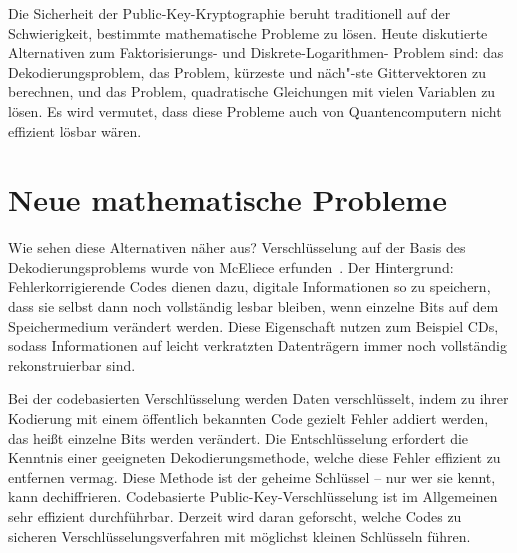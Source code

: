 \begin{refsegment}
Die Sicherheit der Public-Key-Kryptographie beruht traditionell auf der
Schwierigkeit, bestimmte mathematische Probleme zu lösen. Heute
diskutierte Alternativen zum Faktorisierungs- und Diskrete-Logarithmen-
Problem sind: das Dekodierungsproblem, das Problem, kürzeste und näch"-ste
Gittervektoren zu berechnen, und das Problem, quadratische Gleichungen
mit vielen Variablen zu lösen. Es wird vermutet, dass diese Probleme
auch von Quantencomputern nicht effizient lösbar wären.


\section{Neue mathematische Probleme}
\label{sec:probleme}

Wie sehen diese Alternativen näher aus? Verschlüsselung
auf der Basis des Dekodierungsproblems wurde
von McEliece erfunden~\cite{mceliece:1978}.
Der Hintergrund: Fehlerkorrigierende
Codes dienen dazu, digitale Informationen so zu
speichern, dass sie selbst dann noch vollständig lesbar
bleiben, wenn einzelne Bits auf dem Speichermedium
verändert werden. Diese Eigenschaft nutzen zum Beispiel
CDs, sodass Informationen auf leicht verkratzten Datenträgern
immer noch vollständig rekonstruierbar sind.

Bei der codebasierten Verschlüsselung
werden Daten verschlüsselt, indem
zu ihrer Kodierung mit einem öffentlich bekannten Code gezielt Fehler
addiert werden, das heißt einzelne Bits werden verändert. Die
Entschlüsselung erfordert die Kenntnis einer geeigneten
Dekodierungsmethode, welche diese Fehler effizient zu entfernen vermag.
Diese Methode ist der geheime Schlüssel -- nur wer sie kennt, kann
dechiffrieren. Codebasierte Public-Key-Verschlüsselung ist im
Allgemeinen sehr effizient durchführbar. Derzeit wird daran geforscht,
welche Codes zu sicheren Verschlüsselungsverfahren mit möglichst kleinen
Schlüsseln führen.



\end{refsegment}
